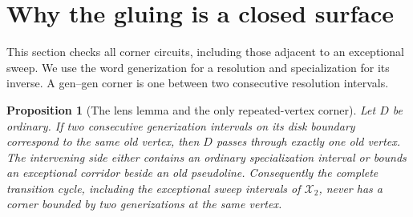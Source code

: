 \documentclass[11pt]{article}
\newtheorem{proposition}[theorem]{Proposition}
\theoremstyle{definition}\newtheorem{definition}[theorem]{Definition}
\begin{document}
\section{Why the gluing is a closed surface}\label{sec:links}
This section checks all corner circuits, including those adjacent to an
exceptional sweep. We use the word generization for a resolution and
specialization for its inverse. A gen--gen corner is one between two
consecutive resolution intervals.
\begin{proposition}[The lens lemma and the only repeated-vertex corner]\label{prop:lens}
Let $D$ be ordinary. If two consecutive generization intervals on its
disk boundary correspond to the same old vertex, then $D$ passes through
exactly one old vertex. The intervening side either contains an ordinary
specialization interval or bounds an exceptional corridor beside an old
pseudoline. Consequently the complete transition cycle, including the
exceptional sweep intervals of $\mathcal X_2$, never has a corner bounded
by two generizations at the same vertex.
\end{proposition}
\end{document}
